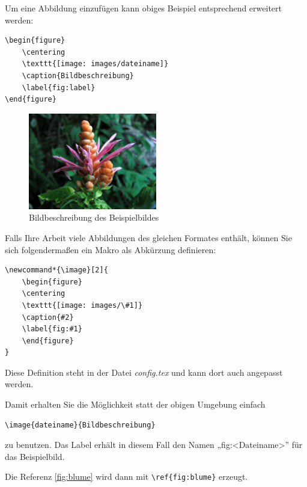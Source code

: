 
Um eine Abbildung einzufügen kann obiges Beispiel entsprechend erweitert werden:

\begin{verbatim}
\begin{figure}
	\centering
	\texttt{[image: images/dateiname]}
	\caption{Bildbeschreibung}
	\label{fig:label}
\end{figure}
\end{verbatim}

\begin{figure}
	\centering
	\includegraphics[width=0.5\textwidth]{images/blume}
	\caption{Bildbeschreibung des Beispielbildes}
	\label{fig:beispiel}
\end{figure}

Falls Ihre Arbeit viele Abbildungen des gleichen Formates enthält, können Sie sich folgendermaßen ein Makro als Abkürzung definieren:

\begin{verbatim}
\newcommand*{\image}[2]{
	\begin{figure}
	\centering
	\texttt{[image: images/\#1]}
	\caption{#2}
	\label{fig:#1}
	\end{figure}
}
\end{verbatim}
Diese Definition steht in der Datei \emph{config.tex} und kann dort auch angepasst werden.

Damit erhalten Sie die Möglichkeit statt der obigen Umgebung einfach
\begin{verbatim}
\image{dateiname}{Bildbeschreibung}
\end{verbatim}
zu benutzen. Das Label erhält in diesem Fall den Namen „fig:<Dateiname>” für das Beispielbild.


Die Referenz \ref{fig:blume} wird dann mit \verb+\ref{fig:blume}+ erzeugt.


